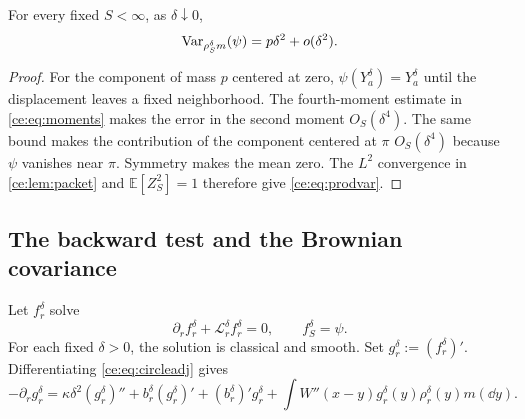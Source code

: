 \documentclass[11pt,reqno]{amsart}
\numberwithin{equation}{section}
\theoremstyle{plain}
\theoremstyle{remark}
\newcommand{\E}{\mathbb E}\newcommand{\Q}{\mathbb Q}\newcommand{\Pb}{\mathbb P}
\begin{document}
\begin{cor}\label{ce:cor:productvariance}
For every fixed $S<\infty$, as $\delta\downarrow0$,
\begin{equation}\label{ce:eq:prodvar}
 \operatorname{Var}_{\rho^\delta_Sm}(\psi)
 =p\delta^2+o(\delta^2).
\end{equation}
\end{cor}
\begin{proof}
For the component of mass $p$ centered at zero, $\psi(Y_a^\delta)=Y_a^\delta$ until the displacement leaves a fixed neighborhood. The fourth-moment estimate in \eqref{ce:eq:moments} makes the error in the second moment $O_S(\delta^4)$. The same bound makes the contribution of the component centered at $\pi$ $O_S(\delta^4)$ because $\psi$ vanishes near $\pi$. Symmetry makes the mean zero. The $L^2$ convergence in \cref{ce:lem:packet} and $\E[Z_S^2]=1$ therefore give \eqref{ce:eq:prodvar}.
\end{proof}

\subsection{The backward test and the Brownian covariance}\label{ce:sec:adjoint}

Let $f^\delta_r$ solve
\begin{equation}\label{ce:eq:backward}
 \partial_r f^\delta_r+\mathcal L^\delta_r f^\delta_r=0,
 \qquad f^\delta_S=\psi.
\end{equation}
For each fixed $\delta>0$, the solution is classical and smooth. Set $g^\delta_r:=(f^\delta_r)'$. Differentiating \eqref{ce:eq:circleadj} gives
\begin{equation}\label{ce:eq:gradback}
 -\partial_r g^\delta_r
 =\kappa\delta^2(g^\delta_r)''+b^\delta_r(g^\delta_r)'
 +(b^\delta_r)'g^\delta_r
 +\int W''(x-y)g^\delta_r(y)\rho^\delta_r(y)m(\dd y).
\end{equation}
\end{document}
